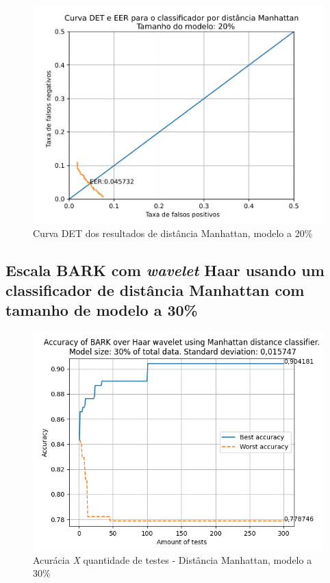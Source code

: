 			\begin{figure}[ht]
				\centering
				\includegraphics[width=\linewidth]{images/results/det/DET_for_classifier_Manhattan_20}
				\caption{Curva DET dos resultados de distância Manhattan, modelo a 20\%}
				\label{fig:detforclassifiermanhattan20}
			\end{figure}
	
			\forceNewPage
		\subsection{Escala BARK com \textit{wavelet} Haar usando um classificador de distância Manhattan com tamanho de modelo a 30\%}
		
			
			
			\begin{figure}[ht]
				\centering
				\includegraphics[width=\linewidth]{images/results/confusionMatrices/classifier_Manhattan_30.png}
				\caption{Acurácia \textit{X} quantidade de testes - Distância Manhattan, modelo a 30\%}
				\label{fig:classifiermanhattan30}
			\end{figure}
		
